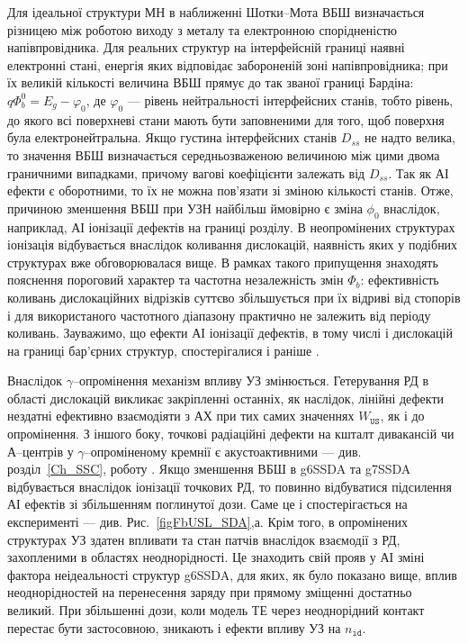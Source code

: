Для ідеальної структури МН в наближенні Шотки--Мота ВБШ визначається різницею між роботою виходу з металу та електронною спорідненістю напівпровідника.
Для реальних структур на інтерфейсній границі наявні електронні стані, енергія яких відповідає забороненій зоні напівпровідника;
при їх великій кількості величина ВБШ прямує до так званої границі Бардіна: $q\Phi_b^0=E_g-\varphi_0$,
де $\varphi_0$ --- рівень нейтральності інтерфейсних станів, тобто рівень, до якого всі поверхневі стани мають бути заповненими для того, щоб
поверхня була електронейтральна.
Якщо густина інтерфейсних станів $D_{ss}$ не надто велика, то значення ВБШ визначається середньозваженою величиною між цими двома
граничними випадками, причому вагові коефіцієнти залежать від $D_{ss}$.
Так як АІ ефекти є оборотними, то їх не можна пов'язати зі зміною кількості станів.
Отже, причиною зменшення ВБШ при УЗН найбільш ймовірно є зміна $\phi_0$ внаслідок, наприклад, АІ іонізації дефектів на границі розділу.
В неопромінених структурах іонізація відбувається внаслідок коливання дислокацій, наявність яких у подібних структурах вже обговорювалася вище.
В рамках такого припущення знаходять пояснення пороговий характер та частотна незалежність змін $\Phi_b$:
ефективність коливань дислокаційних відрізків суттєво збільшується при їх відриві від стопорів і для використаного частотного діапазону
практично не залежить від періоду коливань.
Зауважимо, що ефекти АІ іонізації дефектів, в тому числі і дислокацій на границі бар'єрних структур, спостерігалися і раніше \cite{Olikh:FTP2011,Korotchenkov1995,OstrKorBook}.


Внаслідок $\gamma$--опромінення механізм впливу УЗ змінюється.
Гетерування РД в області дислокацій викликає закріпленні останніх, як наслідок, лінійні дефекти нездатні ефективно взаємодіяти з АХ при тих самих значеннях
$W_\mathtt{US}$, як і до опромінення.
З іншого боку, точкові радіаційні дефекти на кшталт дивакансій чи А--центрів у $\gamma$--опроміненому кремнії є акустоактивними --- див. розділ~\ref{Ch_SSC}, роботу \cite{YOlikh2006TPLr}.
Якщо зменшення ВБШ в g6SSDA та g7SSDA відбувається внаслідок іонізації точкових РД, то повинно відбуватися підсилення АІ ефектів зі збільшенням поглинутої дози.
Саме це і спостерігається на експерименті --- див. Рис.~\ref{figFbUSL_SDA},а.
Крім того, в опромінених структурах УЗ здатен впливати та стан патчів внаслідок взаємодії з РД, захопленими в областях неоднорідності.
Це знаходить свій прояв у АІ зміні фактора неідеальності структур g6SSDA, для яких, як було показано вище, вплив неоднорідностей на перенесення заряду при прямому зміщенні достатньо великий.
При збільшенні дози, коли модель ТЕ через неоднорідний контакт перестає бути застосовною, зникають і ефекти впливу УЗ на $n_\mathtt{id}$.


